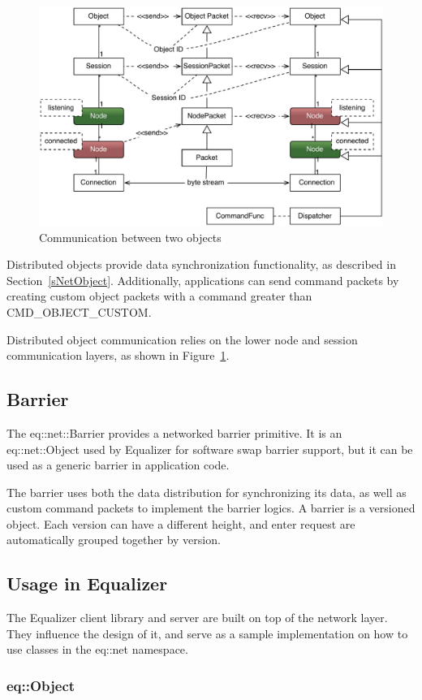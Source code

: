 \documentclass[10pt,a4]{scrartcl}
\newcommand{\fig}[1]{Figure~\ref{#1}}
\newcommand{\sref}[1]{Section~\ref{#1}}
\begin{document}
\begin{figure}
  \includegraphics[width=.618\textwidth]{images/netObject.pdf}
  {\caption{\label{fNetObject}Communication between two objects}}
\end{figure}
Distributed objects provide data synchronization functionality, as
described in \sref{sNetObject}. Additionally, applications can send
command packets by creating custom object packets with a command greater
than \textsf{CMD\_OBJECT\_CUSTOM}.

Distributed object communication relies on the lower node and session
communication layers, as shown in \fig{fNetObject}.

\subsection{Barrier}

The \textsf{eq::net::Barrier} provides a networked barrier primitive. It
is an \textsf{eq::net::Object} used by Equalizer for software swap
barrier support, but it can be used as a generic barrier in application
code.

The barrier uses both the data distribution for synchronizing its data,
as well as custom command packets to implement the barrier logics. A
barrier is a versioned object. Each version can have a different height,
and enter request are automatically grouped together by version.


\subsection{\label{sNetUsage}Usage in Equalizer}

The Equalizer client library and server are built on top of the network
layer. They influence the design of it, and serve as a sample
implementation on how to use classes in the \textsf{eq::net} namespace.

\subsubsection{\label{sEqObject}eq::Object}
\end{document}

